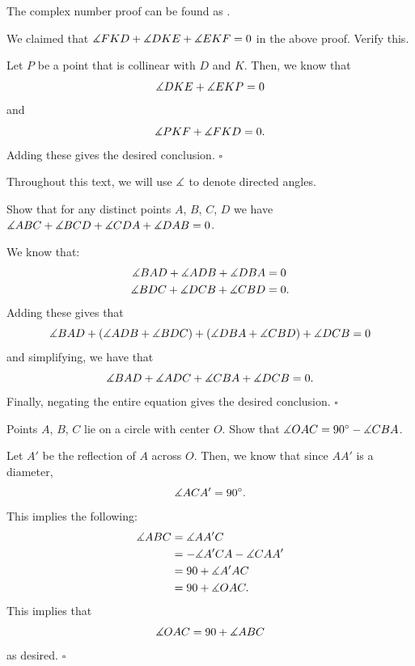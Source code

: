 \documentclass{article}
\begin{document}
\begin{remark*}
The complex number proof can be found as .
\end{remark*}

\begin{problem}[1.28]{}
We claimed that $\measuredangle FKD + \measuredangle DKE + \measuredangle EKF = 0$ in the above proof. Verify this.
\end{problem}

Let $P$ be a point that is collinear with $D$ and $K$. Then, we know that \[\measuredangle DKE + \measuredangle EKP = 0\] and \[\measuredangle PKF + \measuredangle FKD = 0.\] Adding these gives the desired conclusion. $\square$

\begin{remark*}
Throughout this text, we will use $\measuredangle$ to denote directed angles.
\end{remark*}

\begin{problem}[1.29]{}
Show that for any distinct points $A$, $B$, $C$, $D$ we have $\measuredangle ABC + \measuredangle BCD + \measuredangle CDA + \measuredangle DAB = 0$.
\end{problem}

We know that:
\begin{align*}
\measuredangle BAD + \measuredangle ADB + \measuredangle DBA &= 0 \\
\measuredangle BDC + \measuredangle DCB + \measuredangle CBD &= 0.
\end{align*}
Adding these gives that \[\measuredangle BAD + (\measuredangle ADB +\measuredangle BDC) + (\measuredangle DBA + \measuredangle CBD) + \measuredangle DCB  = 0\] and simplifying, we have that \[\measuredangle BAD + \measuredangle ADC + \measuredangle CBA + \measuredangle DCB = 0.\] Finally, negating the entire equation gives the desired conclusion. $\square$

\begin{problem}[1.30]{}
Points $A$, $B$, $C$ lie on a circle with center $O$. Show that $\measuredangle OAC = 90^\circ - \measuredangle CBA$.
\end{problem}

Let $A'$ be the reflection of $A$ across $O$. Then, we know that since $AA'$ is a diameter, \[\measuredangle ACA' = 90^\circ.\] This implies the following:
\begin{align*}
\measuredangle ABC &= \measuredangle AA'C \\
&= -\measuredangle A'CA - \measuredangle CAA' \\
&= 90 + \measuredangle A'AC \\
&= 90 + \measuredangle OAC.
\end{align*}
This implies that \[\measuredangle OAC = 90+\measuredangle ABC\] as desired. $\square$
\end{document}
